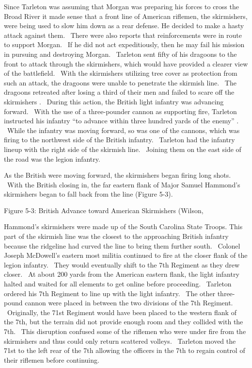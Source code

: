 Since Tarleton was assuming that Morgan was preparing his forces to cross the
Broad River it made sense that a front line of American riflemen, the
skirmishers, were being used to slow him down as a rear defense.  He decided to
make a hasty attack against them.  There were also reports that reinforcements
were in route to support Morgan.  If he did not act expeditiously, then he may
fail his mission in pursuing and destroying Morgan.  Tarleton sent fifty of his
dragoons to the front to attack through the skirmishers, which would have
provided a clearer view of the battlefield.  With the skirmishers utilizing tree
cover as protection from such an attack, the dragoons were unable to penetrate
the skirmish line.  The dragoons retreated after losing a third of their men and
failed to scare off the skirmishers \cite[p.328]{stephenson_patriot_2007}.  During this action,
the British light infantry was advancing forward.  With the use of a
three-pounder cannon as supporting fire, Tarleton instructed his infantry “to
advance within three hundred yards of the enemy” \cite[p.84]{babits_devil_2001}.  While the
infantry was moving forward, so was one of the cannons, which was firing to the
northwest side of the British infantry.  Tarleton had the infantry lineup with
the right side of the skirmish line.  Joining them on the east side of the road
was the legion infantry.  

As the British were moving forward, the skirmishers began firing long shots.
 With the British closing in, the far eastern flank of Major Samuel Hammond’s
skirmishers began to fall back from the line (Figure 5-3).  

Figure 5-3: British Advance toward American Skirmishers (Wilson,

Hammond's skirmishers were made up of the South Carolina State Troops.  This
part of the skirmish line was the closest to the approaching British infantry
because the ridgeline had curved the line to bring them further south.  Colonel
Joseph McDowell’s eastern most militia continued to fire at the closer flank of
the legion infantry.  They would eventually shift to the 7th Regiment as they
drew closer.  At about 200 yards from the American eastern flank, the light
infantry halted and waited for all elements to get online before proceeding.
 Tarleton ordered his 7th Regiment to line up with the light infantry.  The
other three-pound cannon were placed in between the two divisions of the 7th
Regiment.  Originally, the 71st Regiment would have been placed to the western
flank of the 7th, but the terrain did not provide enough room and they collided
with the 7th.  This disruption confused some of the riflemen who were under fire
from the skirmishers and thus could only return scattered volleys.  Tarleton
moved the 71st to the left rear of the 7th allowing the officers in the 7th to
regain control of their riflemen before continuing.


